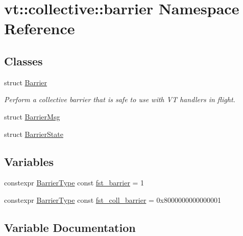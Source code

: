 \hypertarget{namespacevt_1_1collective_1_1barrier}{}\section{vt\+:\+:collective\+:\+:barrier Namespace Reference}
\label{namespacevt_1_1collective_1_1barrier}
\subsection*{Classes}
\begin{DoxyCompactItemize}
\item 
struct \hyperlink{structvt_1_1collective_1_1barrier_1_1_barrier}{Barrier}
\begin{DoxyCompactList}\small\item\em Perform a collective barrier that is safe to use with VT handlers in flight. \end{DoxyCompactList}\item 
struct \hyperlink{structvt_1_1collective_1_1barrier_1_1_barrier_msg}{Barrier\+Msg}
\item 
struct \hyperlink{structvt_1_1collective_1_1barrier_1_1_barrier_state}{Barrier\+State}
\end{DoxyCompactItemize}
\subsection*{Variables}
\begin{DoxyCompactItemize}
\item 
constexpr \hyperlink{namespacevt_a25e481f0d6bbc7204db23d1c87a62e77}{Barrier\+Type} const \hyperlink{namespacevt_1_1collective_1_1barrier_a43d35d830e81f62b5dfb571ce5e0939e}{fst\+\_\+barrier} = 1
\item 
constexpr \hyperlink{namespacevt_a25e481f0d6bbc7204db23d1c87a62e77}{Barrier\+Type} const \hyperlink{namespacevt_1_1collective_1_1barrier_a02bc7e6a890bd33f1e0b1b264326099c}{fst\+\_\+coll\+\_\+barrier} = 0x8000000000000001
\end{DoxyCompactItemize}


\subsection{Variable Documentation}
\mbox{\label{namespacevt_1_1collective_1_1barrier_a43d35d830e81f62b5dfb571ce5e0939e}} 
